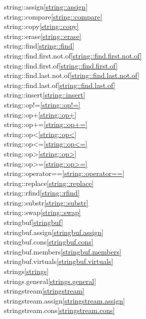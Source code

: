 \begin{multicols}{2}
string::assign\quad\ref{string::assign}\\
string::compare\quad\ref{string::compare}\\
string::copy\quad\ref{string::copy}\\
string::erase\quad\ref{string::erase}\\
string::find\quad\ref{string::find}\\
string::find.first.not.of\quad\ref{string::find.first.not.of}\\
string::find.first.of\quad\ref{string::find.first.of}\\
string::find.last.not.of\quad\ref{string::find.last.not.of}\\
string::find.last.of\quad\ref{string::find.last.of}\\
string::insert\quad\ref{string::insert}\\
string::op!=\quad\ref{string::op!=}\\
string::op+\quad\ref{string::op+}\\
string::op+=\quad\ref{string::op+=}\\
string::op<\quad\ref{string::op<}\\
string::op<=\quad\ref{string::op<=}\\
string::op>\quad\ref{string::op>}\\
string::op>=\quad\ref{string::op>=}\\
string::operator==\quad\ref{string::operator==}\\
string::replace\quad\ref{string::replace}\\
string::rfind\quad\ref{string::rfind}\\
string::substr\quad\ref{string::substr}\\
string::swap\quad\ref{string::swap}\\
stringbuf\quad\ref{stringbuf}\\
stringbuf.assign\quad\ref{stringbuf.assign}\\
stringbuf.cons\quad\ref{stringbuf.cons}\\
stringbuf.members\quad\ref{stringbuf.members}\\
stringbuf.virtuals\quad\ref{stringbuf.virtuals}\\
strings\quad\ref{strings}\\
strings.general\quad\ref{strings.general}\\
stringstream\quad\ref{stringstream}\\
stringstream.assign\quad\ref{stringstream.assign}\\
stringstream.cons\quad\ref{stringstream.cons}\\

\end{multicols}
